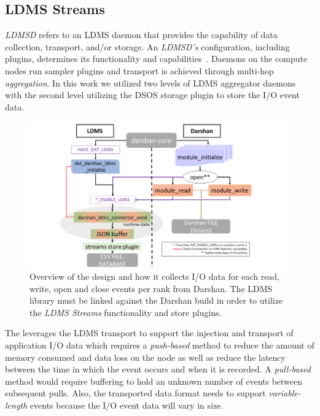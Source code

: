 \subsection{LDMS Streams}
\emph{LDMSD} refers to an LDMS daemon that provides the capability of data 
collection, transport, and/or storage. An \emph{LDMSD's} configuration, 
including plugins, determines its functionality and capabilities~\cite{ldmsgithubwiki}. 
Daemons on the compute nodes run sampler plugins and transport is achieved 
through multi-hop \emph{aggregation}. In this work we utilized two levels of 
LDMS aggregator daemons~\cite{ldmsgithubwiki} with the second level utilizing
the DSOS storage plugin to store the I/O event data.

\begin{figure}
	\centering
	\includegraphics[trim={3.5cm 0 0 0},clip,
	width=1.15\linewidth]{figs/darshan-connector.pdf}
	\caption{Overview of the \connector{} design and how it collects I/O data for each read, write, open and close events per rank from Darshan. The LDMS library must be linked against the Darshan build in order to utilize the \emph{LDMS Streams} functionality and store plugins.}
	\label{f:Darshan Connector}
\end{figure}

The \Darshan{} leverages the LDMS transport to support the injection and transport 
of application I/O data which requires a \emph{push-based} method to reduce the 
amount of memory consumed and data loss on the node as well as reduce the latency 
between the time in which the event occurs and when it is recorded. A \emph{pull-based} 
method would require buffering to hold an unknown number of events between subsequent 
pulls. Also, the transported data format needs to support \emph{variable-length} 
events because the I/O event data will vary in size. 

